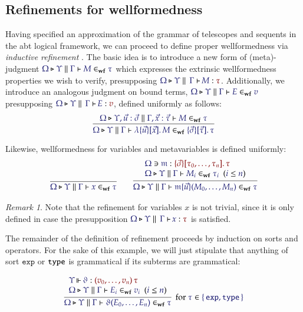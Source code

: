 \documentclass[11pt]{article}
\theoremstyle{definition}
\theoremstyle{remark}
\newtheorem{remark}[thm]{Remark}
\numberwithin{equation}{section}
\def\IModeColorName{MidnightBlue}
\def\OModeColorName{Maroon}
\newcommand\IMode[1]{{\color{\IModeColorName}{#1}}}
\newcommand\OMode[1]{{\color{\OModeColorName}{#1}}}
\newcommand\HypJ[2]{#1\ \ (#2)}
\newcommand\MkSet[1]{\left\{\,#1\,\right\}}
\newcommand\Member[2]{\IMode{#1}\in\IMode{#2}}
\newcommand\MkValence[3]{%
  \ifthenelse{\equal{#1}{}}{}{%
    \{#1\}%
  }%
  \ifthenelse{\equal{#2}{}}{}{%
    [#2]%
  }.\, #3%
}
\newcommand\MkBTm[3]{\mathbb{\lambda}\{#1\}[#2].\, #3}
\newcommand\MkArity[2]{(#1)\, #2}
\newcommand\Leq[2]{\IMode{#1}\leq\IMode{#2}}
\newcommand\IsOperator[3]{
  \IMode{#1}\,{\Vdash}\,\IMode{#2}: \OMode{#3}
}
\newcommand\Lookup[3]{\IMode{#1}\ni\IMode{#2}:\OMode{#3}}
\newcommand\IsAbt[5]{%
  \IMode{#1}\triangleright%
  \IMode{#2}\parallel%
  \,{\IMode{#3}\vdash}\,%
  \IMode{#4}:\OMode{#5}%
}
\newcommand\IsWf[5]{%
  \IMode{#1}\triangleright%
  \IMode{#2}\parallel%
  \IMode{#3}\vdash%
  \IMode{#4}\in_{\mathbf{wf}}\IMode{#5}%
}
\newcommand\MV[1]{\mathfrak{#1}}
\newcommand\MApp[3]{#1\{#2\}(#3)}
\newcommand\App[2]{#1(#2)}
\newcommand\SortExp{\mathtt{exp}}
\begin{document}
\subsection{Refinements for wellformedness}

Having specified an approximation of the grammar of telescopes and sequents in
the abt logical framework, we can proceed to define proper wellformedness via
\emph{inductive refinement} \cite{harper:2016}. The basic idea is to introduce a new form of
(meta)-judgment $\IsWf{\Omega}{\Upsilon}{\Gamma}{M}{\tau}$ which expresses the
extrinsic wellformedness properties we wish to verify, presupposing
$\IsAbt{\Omega}{\Upsilon}{\Gamma}{M}{\tau}$. Additionally, we introduce an
analogous judgment on bound terms, $\IsWf{\Omega}{\Upsilon}{\Gamma}{E}{v}$
presupposing $\IsAbt{\Omega}{\Upsilon}{\Gamma}{E}{v}$, defined uniformly as
follows:
\[
  \infer{
    \IsWf{\Omega}{\Upsilon}{\Gamma}{
      \MkBTm{\vec{u}}{\vec{x}}{M}
    }{
      \MkValence{\vec{\sigma}}{\vec{\tau}}{\tau}
    }
  }{
    \IsWf{\Omega}{\Upsilon,\vec{u}:\vec{\sigma}}{\Gamma,\vec{x}:\vec{\tau}}{M}{\tau}
  }
\]

Likewise, wellformedness for variables and metavariables is defined uniformly:
\begin{gather*}
  \infer{
    \IsWf{\Omega}{\Upsilon}{\Gamma}{x}{\tau}
  }{
  }\qquad
  \infer{
    \IsWf{\Omega}{\Upsilon}{\Gamma}{
      \MApp{\MV{m}}{\vec{u}}{M_0,\dots,M_n}
    }{\tau}
  }{
    \begin{array}{l}
      \Lookup{\Omega}{\MV{m}}{\MkValence{\vec{\sigma}}{\tau_0,\dots,\tau_n}{\tau}}\\
      \HypJ{
        \IsWf{\Omega}{\Upsilon}{\Gamma}{M_i}{\tau_i}
      }{
        \Leq{i}{n}
      }
    \end{array}
  }
\end{gather*}

\begin{remark}
  Note that the refinement for variables $x$ is not trivial, since it is only
  defined in case the presupposition $\IsAbt{\Omega}{\Upsilon}{\Gamma}{x}{\tau}$
  is satisfied.
\end{remark}

The remainder of the definition of refinement proceeds by induction on sorts
and operators. For the sake of this example, we will just stipulate that
anything of sort $\SortExp$ or $\mathtt{type}$ is grammatical if its subterms are
grammatical:

\[
  \infer[
    \text{for $\Member{\tau}{\MkSet{\SortExp,\SortType}}$}
  ]{
    \IsWf{\Omega}{\Upsilon}{\Gamma}{
      \App{\vartheta}{E_0,\dots,E_n}
    }{\tau}
  }{
    \begin{array}{l}
      \IsOperator{\Upsilon}{\vartheta}{
        \MkArity{
          v_0,\dots,v_n
        }{\tau}
      }\\
      \HypJ{
        \IsWf{\Omega}{\Upsilon}{\Gamma}{E_i}{v_i}
      }{
        \Leq{i}{n}
      }
    \end{array}
  }
\]
\end{document}
